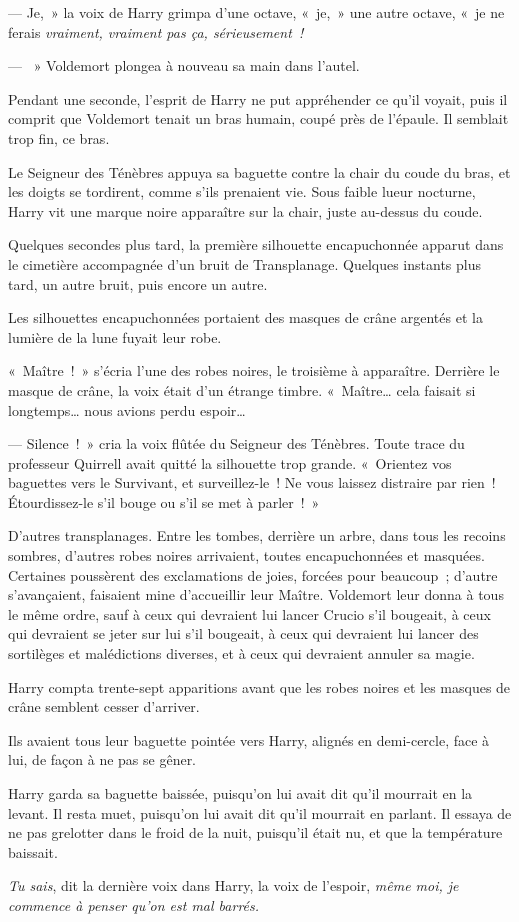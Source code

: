 --- Je,~» la voix de Harry grimpa d'une octave, «~je,~» une autre octave, «~je ne ferais \emph{vraiment, vraiment pas ça, sérieusement~!}

--- ~» Voldemort plongea à nouveau sa main dans l'autel.

Pendant une seconde, l'esprit de Harry ne put appréhender ce qu'il voyait, puis il comprit que Voldemort tenait un bras humain, coupé près de l'épaule.
Il semblait trop fin, ce bras.

Le Seigneur des Ténèbres appuya sa baguette contre la chair du coude du bras, et les doigts se tordirent, comme s'ils prenaient vie.
Sous faible lueur nocturne, Harry vit une marque noire apparaître sur la chair, juste au-dessus du coude.

Quelques secondes plus tard, la première silhouette encapuchonnée apparut dans le cimetière accompagnée d'un bruit de Transplanage.
Quelques instants plus tard, un autre bruit, puis encore un autre.

Les silhouettes encapuchonnées portaient des masques de crâne argentés et la lumière de la lune fuyait leur robe.

«~Maître~!~»
s'écria l'une des robes noires, le troisième à apparaître.
Derrière le masque de crâne, la voix était d'un étrange timbre.
«~Maître… cela faisait si longtemps… nous avions perdu espoir…

--- Silence~!~»
cria la voix flûtée du Seigneur des Ténèbres.
Toute trace du professeur Quirrell avait quitté la silhouette trop grande.
«~Orientez vos baguettes vers le Survivant, et surveillez-le~!
Ne vous laissez distraire par rien~!
Étourdissez-le s'il bouge ou s'il se met à parler~!~»

D'autres transplanages.
Entre les tombes, derrière un arbre, dans tous les recoins sombres, d'autres robes noires arrivaient, toutes encapuchonnées et masquées.
Certaines poussèrent des exclamations de joies, forcées pour beaucoup~; d'autre s'avançaient, faisaient mine d'accueillir leur Maître.
Voldemort leur donna à tous le même ordre, sauf à ceux qui devraient lui lancer Crucio s'il bougeait, à ceux qui devraient se jeter sur lui s'il bougeait, à ceux qui devraient lui lancer des sortilèges et malédictions diverses, et à ceux qui devraient annuler sa magie.

Harry compta trente-sept apparitions avant que les robes noires et les masques de crâne semblent cesser d'arriver.

Ils avaient tous leur baguette pointée vers Harry, alignés en demi-cercle, face à lui, de façon à ne pas se gêner.

Harry garda sa baguette baissée, puisqu'on lui avait dit qu'il mourrait en la levant.
Il resta muet, puisqu'on lui avait dit qu'il mourrait en parlant.
Il essaya de ne pas grelotter dans le froid de la nuit, puisqu'il était nu, et que la température baissait.

\emph{Tu sais}, dit la dernière voix dans Harry, la voix de l'espoir, \emph{même moi, je commence à penser qu'on est mal barrés.}
